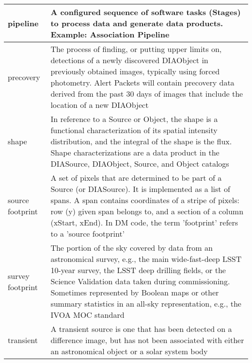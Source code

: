 \begin{longtable}{|p{}|p{}|}
pipeline & A configured sequence of software tasks (Stages) to process data and generate data products. Example: \gls{Association Pipeline} \\\hline
precovery & The process of finding, or putting upper limits on, detections of a newly discovered \gls{DIAObject} in previously obtained images, typically using \gls{forced photometry}. \gls{Alert} Packets will contain \gls{precovery} data derived from the past 30 days of images that include the location of a new \gls{DIAObject} \\\hline
shape & In reference to a \gls{Source} or Object, the \gls{shape} is a functional characterization of its spatial intensity distribution, and the integral of the \gls{shape} is the \gls{flux}. Shape characterizations are a data product in the \gls{DIASource}, \gls{DIAObject}, \gls{Source}, and Object catalogs \\\hline
source \gls{footprint} & A set of pixels that are determined to be part of a \gls{Source} (or \gls{DIASource}). It is implemented as a list of spans. A span contains coordinates of a stripe of pixels: row (y) given span belongs to, and a section of a column (xStart, xEnd). In \gls{DM} code, the term 'footprint' refers to a 'source \gls{footprint}' \\\hline
survey \gls{footprint} & The portion of the sky covered by data from an astronomical survey, e.g., the main wide-fast-deep \gls{LSST} 10-year survey, the \gls{LSST} deep drilling fields, or the Science \gls{Validation} data taken during commissioning.  Sometimes represented by Boolean maps or other summary statistics in an all-sky representation, e.g., the \gls{IVOA} \gls{MOC} standard \\\hline
transient & A \gls{transient} source is one that has been detected on a difference image, but has not been associated with either an \gls{astronomical object} or a solar system body \\\hline
\end{longtable}
